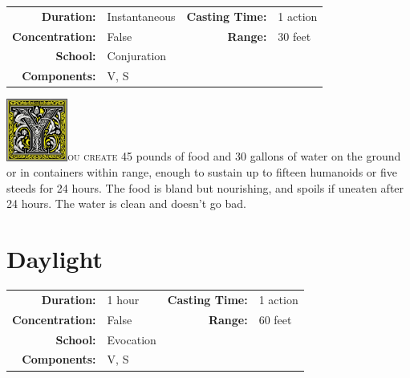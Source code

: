 \documentclass[12pt,showtrims]{memoir}
\begin{document}
{
\small\centering\vspace{-6pt}
\begin{tabular}{rlrl}
\toprule

\textbf{Duration:} & Instantaneous &
\textbf{Casting Time:} & 1 action \\
\textbf{Concentration:} & False &
\textbf{Range:} & 30 feet \\
\textbf{School:} & Conjuration \\
\textbf{Components:} & \multicolumn{3}{p{0.7\textwidth}}{V, S}\\

\bottomrule
\end{tabular}
}

\vspace{1\baselineskip}\noindent 
\lettrine[lines=4]{\includegraphics[height=58pt]{initials/Y.png}}{ou create 45} pounds of food and 30 gallons of water on the ground or in containers within range, enough to sustain up to fifteen humanoids or five steeds for 24 hours. The food is bland but nourishing, and spoils if uneaten after 24 hours. The water is clean and doesn't go bad.

\newpage
\section*{Daylight}

{
\small\centering\vspace{-6pt}
\begin{tabular}{rlrl}
\toprule

\textbf{Duration:} & 1 hour &
\textbf{Casting Time:} & 1 action \\
\textbf{Concentration:} & False &
\textbf{Range:} & 60 feet \\
\textbf{School:} & Evocation \\
\textbf{Components:} & \multicolumn{3}{p{0.7\textwidth}}{V, S}\\

\bottomrule
\end{tabular}
}
\end{document}
